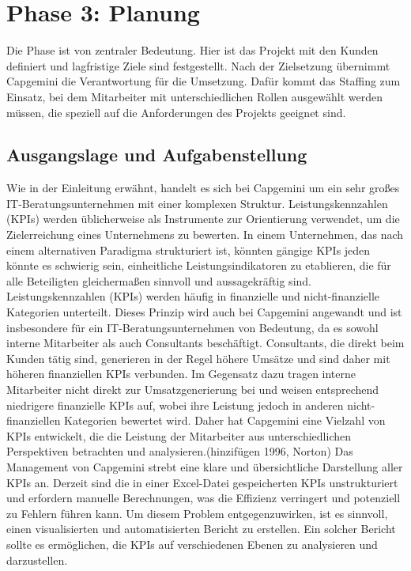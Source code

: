\chapter{Phase 3: Planung}
Die Phase ist von zentraler Bedeutung. Hier ist das Projekt mit den Kunden definiert und lagfristige Ziele sind festgestellt. Nach der Zielsetzung übernimmt Capgemini die Verantwortung für die Umsetzung. Dafür kommt das Staffing zum Einsatz, bei dem Mitarbeiter mit unterschiedlichen Rollen ausgewählt werden müssen, die speziell auf die Anforderungen des Projekts geeignet sind.
\section{Ausgangslage und Aufgabenstellung}
Wie in der Einleitung erwähnt, handelt es sich bei Capgemini um ein sehr großes IT-Beratungsunternehmen mit einer komplexen Struktur. Leistungskennzahlen (KPIs) werden üblicherweise als Instrumente zur Orientierung verwendet, um die Zielerreichung eines Unternehmens zu bewerten. In einem Unternehmen, das nach einem alternativen Paradigma strukturiert ist, könnten gängige KPIs jeden könnte es schwierig sein, einheitliche Leistungsindikatoren zu etablieren, die für alle Beteiligten gleichermaßen sinnvoll und aussagekräftig sind\cite{aro2023using}.
\newline
Leistungskennzahlen (KPIs) werden häufig in finanzielle und nicht-finanzielle Kategorien unterteilt. Dieses Prinzip wird auch bei Capgemini angewandt und ist insbesondere für ein IT-Beratungsunternehmen von Bedeutung, da es sowohl interne Mitarbeiter als auch Consultants beschäftigt. Consultants, die direkt beim Kunden tätig sind, generieren in der Regel höhere Umsätze und sind daher mit höheren finanziellen KPIs verbunden. Im Gegensatz dazu tragen interne Mitarbeiter nicht direkt zur Umsatzgenerierung bei und weisen entsprechend niedrigere finanzielle KPIs auf, wobei ihre Leistung jedoch in anderen nicht-finanziellen Kategorien bewertet wird. Daher hat Capgemini eine Vielzahl von KPIs entwickelt, die die Leistung der Mitarbeiter aus unterschiedlichen Perspektiven betrachten und analysieren\cite{kald2000performance}.(hinzifügen 1996, Norton)
\newline
Das Management von Capgemini strebt eine klare und übersichtliche Darstellung aller KPIs an. Derzeit sind die in einer Excel-Datei gespeicherten KPIs unstrukturiert und erfordern manuelle Berechnungen, was die Effizienz verringert und potenziell zu Fehlern führen kann. Um diesem Problem entgegenzuwirken, ist es sinnvoll, einen visualisierten und automatisierten Bericht zu erstellen. Ein solcher Bericht sollte es ermöglichen, die KPIs auf verschiedenen Ebenen zu analysieren und darzustellen.
